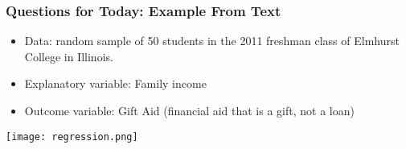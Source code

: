 \documentclass[slides]{beamer}
\newcommand{\blue}[1]{\textcolor{blue2}{#1}}
\begin{document}
%
%
%


\begin{frame}[fragile]
\frametitle{Questions for Today: Example From Text}
\begin{itemize}
\pause\item Data: random sample of 50 students in the 2011 freshman class of Elmhurst College in Illinois.
\pause\item Explanatory variable: Family income
\pause\item Outcome variable: Gift Aid (financial aid that is a gift, not a loan)
\end{itemize}

\begin{center}
\texttt{[image: regression.png]}
\end{center}

\end{frame}
\end{document}
